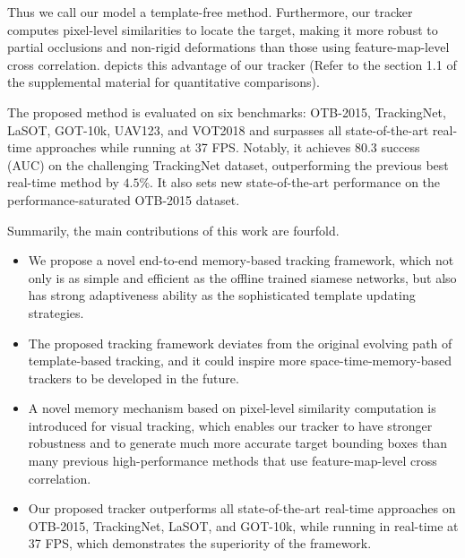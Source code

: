 \documentclass[final]{cvpr}
\begin{document}
Thus we call our model a template-free method.
Furthermore, our tracker computes pixel-level similarities to locate the target, making it more robust to partial occlusions and non-rigid deformations than those using feature-map-level cross correlation.
 depicts this advantage of our tracker (Refer to the section 1.1 of the supplemental material for quantitative comparisons).
\par
The proposed method is evaluated on six benchmarks: OTB-2015, TrackingNet, LaSOT, GOT-10k, UAV123, and VOT2018 and surpasses all state-of-the-art real-time approaches while running at 37 FPS.
Notably, it achieves 80.3 success (AUC) on the challenging TrackingNet dataset, outperforming the previous best real-time method by $4.5\%$.
It also sets new state-of-the-art performance on the performance-saturated OTB-2015 dataset.

Summarily, the main contributions of this work are fourfold.
\vspace{-0.5em}
\begin{itemize}
\item{We propose a novel end-to-end memory-based tracking framework, which not only is as simple and efficient as the offline trained siamese networks, but also has strong adaptiveness ability as the sophisticated template updating strategies.}
\vspace{-0.5em}
\item{The proposed tracking framework deviates from the original evolving path of template-based tracking, and it could inspire more space-time-memory-based trackers to be developed in the future.}
\vspace{-0.5em}
\item{A novel memory mechanism based on pixel-level similarity computation is introduced for visual tracking, which enables our tracker to have stronger robustness and to generate much more accurate target bounding boxes than many previous high-performance methods that use feature-map-level cross correlation.}
\vspace{-0.5em}
\item Our proposed tracker outperforms all state-of-the-art real-time approaches on OTB-2015, TrackingNet, LaSOT, and GOT-10k, while running in real-time at 37 FPS, which demonstrates the superiority of the framework.
\end{itemize}
\end{document}
